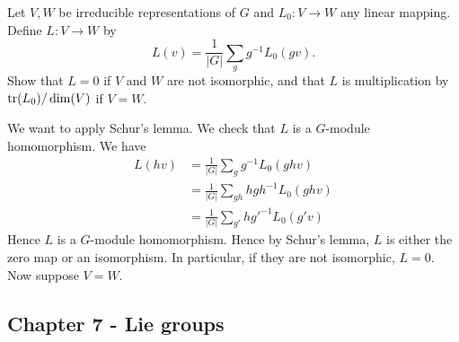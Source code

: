\documentclass[11pt, english]{article}
\begin{document}
\begin{exc}[Exercise 2.34]
Let $V,W$ be irreducible representations of $G$ and $L_0:V \to W$ any linear mapping. Define $L:V \to W$ by 
$$
L(v) = \frac{1}{\lvert G \rvert} \sum_g g^{-1} L_0(gv).
$$
Show that $L=0$ if $V$ and $W$ are not isomorphic, and that $L$ is multiplication by $\operatorname{tr}(L_0)/\dim (V)$ if $V=W$.
\end{exc}
\begin{sol}
We want to apply Schur's lemma. We check that $L$ is a $G$-module homomorphism. We have
\begin{align*}
L(hv) &= \frac{1}{\lvert G \rvert} \sum_g g^{-1}L_0(ghv) \\
&= \frac{1}{\lvert G\rvert} \sum_{gh} h {gh}^{-1}L_0(ghv) \\
&= \frac{1}{\lvert G\rvert} \sum_{g'} h {g'}^{-1}L_0(g'v)
\end{align*}
Hence $L$ is a $G$-module homomorphism. Hence by Schur's lemma, $L$ is either the zero map or an isomorphism. In particular, if they are not isomorphic, $L=0$. Now suppose $V=W$. 
\end{sol}

\subsection{Chapter 7 - Lie groups}
\end{document}
